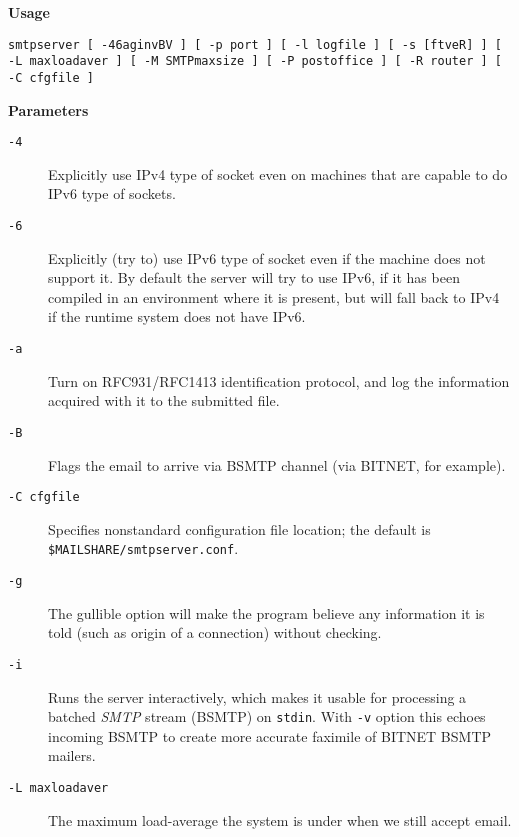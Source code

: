 {\bf Usage}

{\tt smtpserver [ -46aginvBV ] [ -p port ] [ -l logfile ] [ -s [ftveR] ] [ -L maxloadaver ] [ -M SMTPmaxsize ] [ -P postoffice ] [ -R router ] [ -C cfgfile ]}

{\bf Parameters}

\begin{description}
\item[{\tt -4}] \mbox{}

Explicitly use IPv4 type of socket even on machines that are capable to do IPv6 type of sockets.

\item[{\tt -6}] \mbox{}

Explicitly (try to) use IPv6 type of socket even if the machine does not support it. 
By default the server will try to use IPv6, if it has been compiled in an environment where it is present, 
but will fall back to IPv4 if the runtime system does not have IPv6.

\item[{\tt -a}] \mbox{}

Turn on RFC931/RFC1413 identification protocol, and log the information acquired with it to the 
submitted file.

\item[{\tt -B}] \mbox{}

Flags the email to arrive via BSMTP channel (via BITNET, for example).

\item[{\tt -C cfgfile}] \mbox{}

Specifies nonstandard configuration file location; the default is 
{\tt \$MAILSHARE/smtpserver.conf}.

\item[{\tt -g}] \mbox{}

The gullible option will make the program believe any information it is told 
(such as origin of a connection) without checking.

\item[{\tt -i}] \mbox{}

Runs the server interactively, which makes it usable for processing a batched 
{\em SMTP\/} stream (BSMTP) on {\tt stdin}. With {\tt -v} option this echoes incoming BSMTP to create more 
accurate faximile of BITNET BSMTP mailers.

\item[{\tt -L maxloadaver}] \mbox{}

The maximum load-average the system is under when we still accept email.


\end{description}
